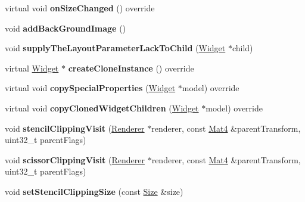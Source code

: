 \begin{DoxyCompactItemize}
\mbox{\label{classui_1_1Layout_aa2bce7a209281f634a37fbdbc9168469}} 
virtual void {\bfseries on\+Size\+Changed} () override
\item 
\mbox{\label{classui_1_1Layout_ab7ba2e118264f125c2c6c605da729f86}} 
void {\bfseries add\+Back\+Ground\+Image} ()
\item 
\mbox{\label{classui_1_1Layout_a617ae9c48b13a68f5b8e37f4e56cd891}} 
void {\bfseries supply\+The\+Layout\+Parameter\+Lack\+To\+Child} (\hyperlink{classui_1_1Widget}{Widget} $\ast$child)
\item 
\mbox{\label{classui_1_1Layout_a946ca524b8ede6894ad4ce23391a3157}} 
virtual \hyperlink{classui_1_1Widget}{Widget} $\ast$ {\bfseries create\+Clone\+Instance} () override
\item 
\mbox{\label{classui_1_1Layout_a690c94ef9d7eb7e45f869e2d3b32238f}} 
virtual void {\bfseries copy\+Special\+Properties} (\hyperlink{classui_1_1Widget}{Widget} $\ast$model) override
\item 
\mbox{\label{classui_1_1Layout_a0dec2e6896f420c469dcf620dbb74496}} 
virtual void {\bfseries copy\+Cloned\+Widget\+Children} (\hyperlink{classui_1_1Widget}{Widget} $\ast$model) override
\item 
\mbox{\label{classui_1_1Layout_ad510882071e1da7fc16f7da109afaf6f}} 
void {\bfseries stencil\+Clipping\+Visit} (\hyperlink{classRenderer}{Renderer} $\ast$renderer, const \hyperlink{classMat4}{Mat4} \&parent\+Transform, uint32\+\_\+t parent\+Flags)
\item 
\mbox{\label{classui_1_1Layout_a4e8b945c8cf94046686c2751ae3ed48b}} 
void {\bfseries scissor\+Clipping\+Visit} (\hyperlink{classRenderer}{Renderer} $\ast$renderer, const \hyperlink{classMat4}{Mat4} \&parent\+Transform, uint32\+\_\+t parent\+Flags)
\item 
\mbox{\label{classui_1_1Layout_a07666c1edbdba7b1afa3b4ac140ee8c7}} 
void {\bfseries set\+Stencil\+Clipping\+Size} (const \hyperlink{classSize}{Size} \&size)
\item 

\end{DoxyCompactItemize}
